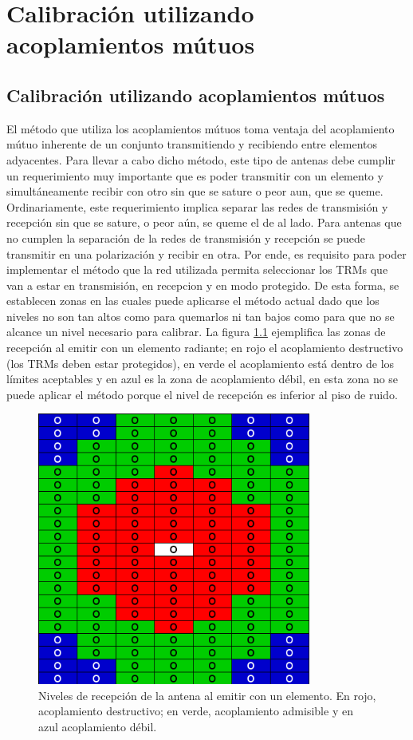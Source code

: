 \chapter{Calibración utilizando acoplamientos mútuos}
\label{ch:convertidores}

\section{Calibración utilizando acoplamientos mútuos}

El método que utiliza los acoplamientos mútuos toma ventaja del acoplamiento mútuo inherente de un conjunto transmitiendo
y recibiendo entre elementos adyacentes. Para llevar a cabo dicho método, este tipo de antenas debe cumplir un
requerimiento muy importante que es poder transmitir con un elemento y simultáneamente recibir con otro sin que se sature o peor
aun, que se queme. Ordinariamente, este requerimiento implica separar las redes de transmisión y recepción \cite{Gao2001} sin 
que se sature, o peor aún, se queme el de al lado. Para antenas que no cumplen la separación de la redes de transmisión y 
recepción se puede transmitir en una polarización y recibir en otra. Por ende, es requisito para poder implementar el método
que la red utilizada permita seleccionar los TRMs que van a estar en transmisión, en recepcion y en modo protegido. De esta 
forma, se establecen zonas en las cuales puede aplicarse el método actual dado que los niveles no son tan altos como para 
quemarlos ni tan bajos como para que no se alcance un nivel necesario para calibrar. La figura \ref{fig:levels} ejemplifica las 
zonas de recepción al emitir con un elemento radiante; en rojo el acoplamiento destructivo (los TRMs deben estar protegidos), en 
verde el acoplamiento está dentro de los límites aceptables y en azul es la zona de acoplamiento débil, en esta zona no se 
puede aplicar el método porque el nivel de recepción es inferior al piso de ruido. 

\begin{figure}[H]
 \centering
 \includegraphics[width=9cm]{gfx/mutualCouplingLevels.png}
 \caption{Niveles de recepción de la antena al emitir con un elemento. En rojo, acoplamiento destructivo; en verde, 
 acoplamiento admisible y en azul acoplamiento débil.}
 \label{fig:levels}
\end{figure}

